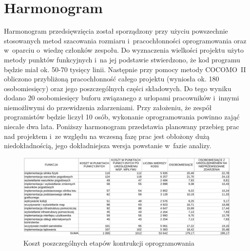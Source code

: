 \documentclass{mwrep}
\begin{document}
\chapter{Harmonogram}
Harmonogram przedsięwzięcia został sporządzony przy użyciu powszechnie stosowanych metod szacowania rozmiaru i~pracochłonności oprogramowania oraz w~oparciu o~wiedzę członków zespołu. Do wyznaczenia wielkości projektu użyto metody punktów funkcyjnych i~na jej podstawie stwierdzono, że kod programu będzie miał ok. 50-70 tysięcy linii. Następnie przy pomocy metody COCOMO~II obliczono przybliżoną pracochłonność całego projektu (wyniosła ok. 180 osobomiesięcy) oraz jego poszczególnych części składowych. Do tego wyniku dodano 20 osobomiesięcy buforu związanego z urlopami pracowników i~innymi niemożliwymi do przewidzenia zdarzeniami. Przy założeniu, że zespół programistów będzie liczył 10 osób, wykonanie oprogramowania powinno zająć niecałe dwa lata.
Poniższy harmonogram przedstawia planowany przebieg prac nad projektem i~ze względu na wczesną fazę prac jest obłożony dużą niedokładnością, jego dokładniejsza wersja powstanie w~fazie analizy.

\vspace{2cm}

\begin{figure}[!h]
    \centerline{\includegraphics*[scale=0.75]{punkty-funkcyjne-crop.pdf}}
    \caption{Koszt poszczególnych etapów kontrukcji oprogramowania}
\end{figure}
\end{document}
